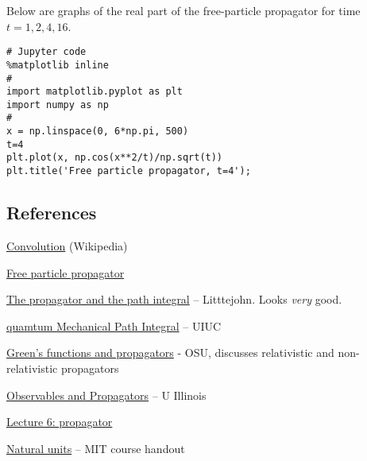 Below are graphs of the real part of the free-particle propagator for time $t = 1, 2, 4,16$.






\begin{verbatim}
# Jupyter code
%matplotlib inline
#
import matplotlib.pyplot as plt
import numpy as np
#
x = np.linspace(0, 6*np.pi, 500)
t=4
plt.plot(x, np.cos(x**2/t)/np.sqrt(t))
plt.title('Free particle propagator, t=4');
\end{verbatim}


\subsection{References}

\href{https://en.wikipedia.org/wiki/Convolution}{Convolution} (Wikipedia)

\href{http://www.physics.rutgers.edu/~steves/501/Lectures_Final/Lec06_Propagator.pdf}{Free particle propagator}

\href{http://bohr.physics.berkeley.edu/classes/221/0708/notes/pathint.pdf}{The propagator and the path integral} -- Litttejohn.  Looks \emph{very} good.

\href{http://www.ks.uiuc.edu/Services/Class/PHYS480/qm_PDF/chp2.pdf}{quamtum Mechanical Path Integral} -- UIUC

\href{http://www.phy.ohiou.edu/~elster/lectures/relqm_17.pdf}{Green's functions and propagators}  - OSU, discusses relativistic and non-relativistic propagators

\href{http://eduardo.physics.illinois.edu/phys582/582-chapter10.pdf}{Observables and Propagators} -- U Illinois

\href{http://www.physics.rutgers.edu/~steves/501/Lectures_Final/Lec06_Propagator.pdf}{Lecture 6: propagator}

\href{https://stuff.mit.edu/afs/athena/course/8/8.06/spring08/handouts/units.pdf}{Natural units} -- MIT course handout